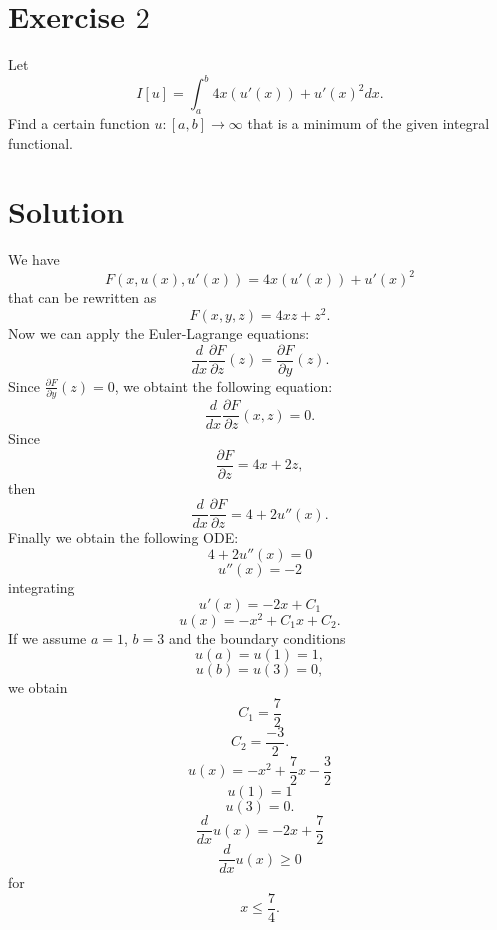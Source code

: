 \documentclass[a4paper, twoside, openany]{book}
\begin{document}
\section*{Exercise $2$}
Let 
$$I[u] = \int_a^b 4x(u'(x)) + u'(x)^2 dx.$$
Find a certain function $u: [a, b] \rightarrow \infty$ that is a minimum of the given integral functional. 
\section*{Solution}
We have
$$F(x, u(x), u'(x)) = 4x (u'(x)) + u'(x)^2$$
that can be rewritten as
$$F(x, y, z) = 4xz + z^2.$$
Now we can apply the Euler-Lagrange equations:
$$\frac{d}{dx} \frac{\partial F}{\partial z}(z) = \frac{\partial F}{\partial y}(z).$$
Since $ \frac{\partial F}{\partial y}(z) = 0$, we obtaint the following equation:
$$\frac{d}{dx}\frac{\partial F}{\partial z}(x, z) = 0.$$
Since 
$$\frac{\partial F}{\partial z} = 4x + 2z,$$
then
$$\frac{d}{dx}\frac{\partial F}{\partial z} = 4 + 2 u''(x).$$
Finally we obtain the following ODE:
$$4 + 2 u''(x) = 0$$
$$u''(x) = -2$$
integrating
$$u'(x) = -2x + C_1$$
$$u(x) = -x^2 + C_1x + C_2.$$
If we assume $a = 1$, $b = 3$ and the boundary conditions
$$u(a) = u(1) = 1,$$
$$u(b) = u(3) = 0,$$
we obtain 
$$C_1 = \frac{7}{2}$$
$$C_2 = \frac{-3}{2}.$$
$$u(x) = - x^2 + \frac{7}{2} x - \frac{3}{2}$$
$$u(1) = 1$$
$$u(3) = 0.$$ 
$$\frac{d}{dx} u(x) = - 2x + \frac{7}{2}$$
$$\frac{d}{dx} u(x) \geq 0$$
for
$$x \leq \frac{7}{4}.$$
\begin{figure}[!ht]
\begin{center}
\end{center}
\end{figure}
\begin{figure}[!ht]
\begin{center}
\end{center}
\end{figure}
\clearpage
\end{document}
